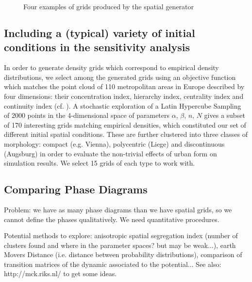 \documentclass[11pt]{article}
\begin{document}
\begin{figure}[htbp] \begin{center} 
 \caption{Four examples of grids produced by the spatial generator} \label{fig:spatialGen} \end{center} \end{figure} %

\subsection{Including a (typical) variety of initial conditions in the sensitivity analysis}

In order to generate density grids which correspond to empirical density distributions, we select among the generated grids using an objective function which matches the point cloud of 110 metropolitan areas in Europe described by four dimensions: their concentration index, hierarchy index, centrality index and continuity index (cf. \cite{LeNechet2015}). A stochastic exploration of a Latin Hypercube Sampling of 2000 points in the 4-dimensional space of parameters {$\alpha$, $\beta$, $n$, $N$} gives a subset of 170 interesting grids matching empirical densities, which constituted our set of different initial spatial conditions. These are further clustered into three classes of morphology: compact (e.g. Vienna), polycentric (Liege) and discontinuous (Augsburg) in order to evaluate the non-trivial effects of urban form on simulation results. We select 15 grids of each type to work with.


\subsection{Comparing Phase Diagrams}

Problem: we have as many phase diagrams than we have spatial grids, so we cannot define the phases qualitatively. We need quantitative procedures.

Potential methods to explore: anisotropic spatial segregation index (number of clusters found and where in the parameter spaces? but may be weak...), earth Movers Distance (i.e. distance between probability distributions), comparison of transition matrices of the dynamic associated to the potential...
See also: http://mck.riks.nl/ to get some ideas.
\end{document}
